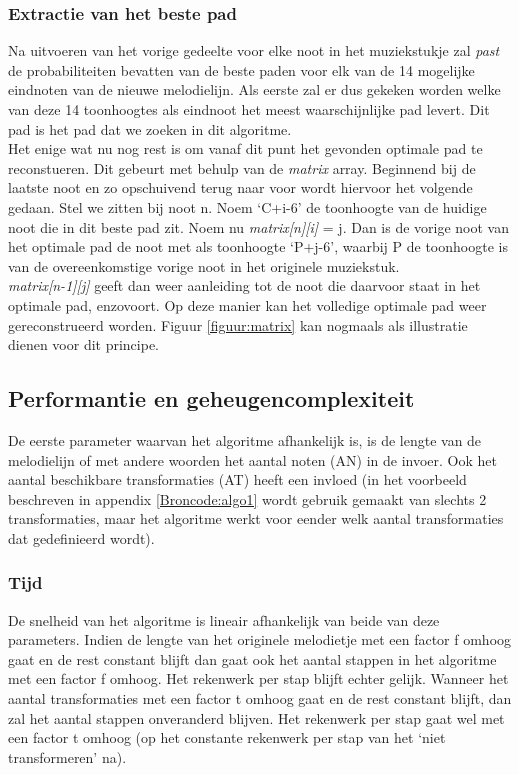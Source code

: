 \subsubsection{Extractie van het beste pad}
Na uitvoeren van het vorige gedeelte voor elke noot in het muziekstukje zal \textit{past} de probabiliteiten bevatten van de beste paden voor elk van de 14 mogelijke eindnoten van de nieuwe melodielijn. Als eerste zal er dus gekeken worden welke van deze 14 toonhoogtes als eindnoot het meest waarschijnlijke pad levert. Dit pad is het pad dat we zoeken in dit algoritme.\\ 
Het enige wat nu nog rest is om vanaf dit punt het gevonden optimale pad te reconstueren. Dit gebeurt met behulp van de \textit{matrix} array. Beginnend bij de laatste noot en zo opschuivend terug naar voor wordt hiervoor het volgende gedaan. Stel we zitten bij noot n. Noem `C+i-6' de toonhoogte van de huidige noot die in dit beste pad zit. Noem nu \textit{matrix[n][i]} = j. Dan is de vorige noot van het optimale pad de noot met als toonhoogte `P+j-6', waarbij P de toonhoogte is van de overeenkomstige vorige noot in het originele muziekstuk.\\ \textit{matrix[n-1][j]} geeft dan weer aanleiding tot de noot die daarvoor staat in het optimale pad, enzovoort. Op deze manier kan het volledige optimale pad weer gereconstrueerd worden. Figuur \ref{figuur:matrix} kan nogmaals als illustratie dienen voor dit principe.

\subsection{Performantie en geheugencomplexiteit}
De eerste parameter waarvan het algoritme afhankelijk is, is de lengte van de melodielijn of met andere woorden het aantal noten (AN) in de invoer. Ook het aantal beschikbare transformaties (AT) heeft een invloed (in het voorbeeld beschreven in appendix \ref{Broncode:algo1} wordt gebruik gemaakt van slechts 2 transformaties, maar het algoritme werkt voor eender welk aantal transformaties dat gedefinieerd wordt).

\subsubsection{Tijd} 
De snelheid van het algoritme is lineair afhankelijk van beide van deze parameters. Indien de lengte van het originele melodietje met een factor f omhoog gaat en de rest constant blijft dan gaat ook het aantal stappen in het algoritme met een factor f omhoog. Het rekenwerk per stap blijft echter gelijk. Wanneer het aantal transformaties met een factor t omhoog gaat en de rest constant blijft, dan zal het aantal stappen onveranderd blijven. Het rekenwerk per stap gaat wel met een factor t omhoog (op het constante rekenwerk per stap van het `niet transformeren' na).


